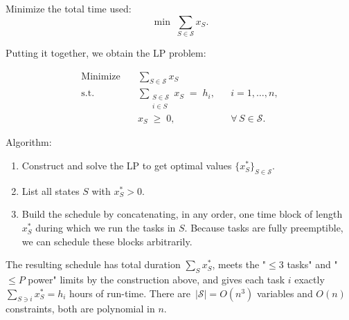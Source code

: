 \documentclass[11pt]{article}
\begin{document}
\begin{description}
Minimize the total time used:
\[
  \min\;\sum_{S\in\mathcal{S}} x_S.
\]

Putting it together, we obtain the LP problem:

\[
\begin{aligned}
  \text{Minimize}\quad
    & \sum_{S\in\mathcal{S}} x_S
  \\
  \text{s.t.}\quad
    & \sum_{\substack{S\in\mathcal{S}\\i\in S}} x_S \;=\; h_i,
      && i=1,\dots,n, 
  \\
    & x_S \;\ge\; 0,
      && \forall\,S\in\mathcal{S}.
\end{aligned}
\]

Algorithm:
\begin{enumerate}
\item Construct and solve the LP to get optimal values \(\{x_S^*\}_{S\in\mathcal S}\).  
\item List all states \(S\) with \(x_S^*>0\).  
\item Build the schedule by concatenating, in any order, one time block of length \(x_S^*\) during which we run the tasks in \(S\). Because tasks are fully preemptible, we can schedule these blocks arbitrarily.
\end{enumerate}

The resulting schedule has total duration \(\sum_S x_S^*\), meets the "\(\le3\) tasks" and "\(\le P\) power" limits by the construction above, and gives each task \(i\) exactly \(\sum_{S\ni i} x_S^*=h_i\) hours of run-time.
There are \(\,|\mathcal{S}|=O(n^3)\) variables and \(O(n)\) constraints, both are polynomial in \(n\).

\end{description}
\end{document}
